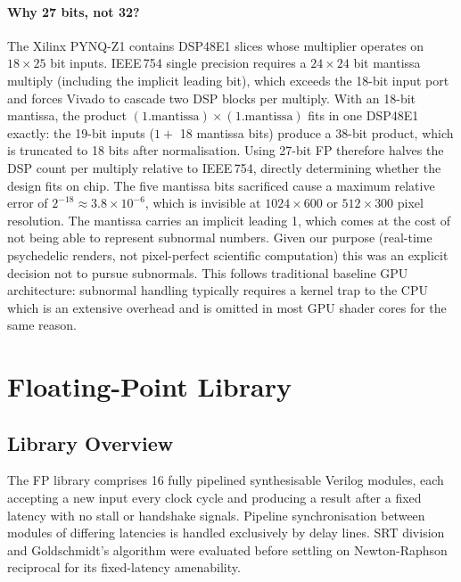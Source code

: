 \paragraph{Why 27 bits, not 32?}\mbox{}\newline
The Xilinx PYNQ-Z1 contains DSP48E1 slices whose multiplier operates on
$18 \times 25$ bit inputs. IEEE\,754 single precision requires a $24 \times 24$
bit mantissa multiply (including the implicit leading bit), which exceeds the
18-bit input port and forces Vivado to cascade two DSP blocks per multiply. With
an 18-bit mantissa, the product $(1.\text{mantissa}) \times (1.\text{mantissa})$
fits in one DSP48E1 exactly: the 19-bit inputs ($1 +$ 18 mantissa bits) produce
a 38-bit product, which is truncated to 18 bits after normalisation. Using
27-bit FP therefore halves the DSP count per multiply relative to IEEE\,754,
directly determining whether the design fits on chip. The five mantissa bits
sacrificed cause a maximum relative error of $2^{-18} \approx 3.8 \times
10^{-6}$, which is invisible at $1024 \times 600$ or $512 \times 300$ pixel
resolution. The mantissa carries an implicit leading 1, which comes at the cost
of not being able to represent subnormal numbers. Given our purpose (real-time
psychedelic renders, not pixel-perfect scientific computation) this was an
explicit decision not to pursue subnormals. This follows traditional baseline
GPU architecture: subnormal handling typically requires a kernel trap to the CPU
which is an extensive overhead and is omitted in most GPU shader cores for the same
reason.


\section{Floating-Point Library}
\label{sec:fplibrary}

\subsection{Library Overview}

The FP library comprises 16 fully pipelined synthesisable Verilog modules,
each accepting a new input every clock cycle and producing a result after a
fixed latency with no stall or handshake signals. Pipeline synchronisation
between modules of differing latencies is handled exclusively by
 delay lines. SRT division and Goldschmidt's algorithm were
evaluated before settling on Newton-Raphson reciprocal for its fixed-latency
amenability.

